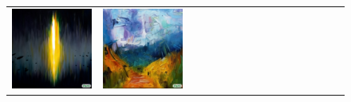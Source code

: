 \begin{figure}[ht!]
\begin{adjustwidth}{-0.8in}{-0.5in}
\begin{tabular}{cccccccccccccccccccc}
\multicolumn{3}{c}{\includegraphics[width=\twobytwocolwidth\textwidth]{figures/cherries/art_portal.jpg}} &
\multicolumn{3}{c}{\includegraphics[width=\twobytwocolwidth\textwidth]{figures/cherries/art_find_way.jpg}} \\

\end{tabular}
\end{adjustwidth}
\end{figure}
